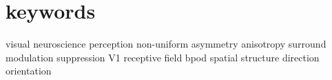 \section*{keywords}
visual neuroscience perception non-uniform asymmetry anisotropy surround modulation suppression V1 receptive field bpod spatial structure direction orientation
\clearpage
\thispagestyle{empty}
\cleardoublepage